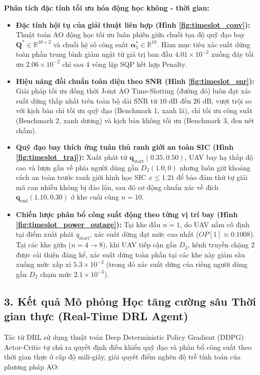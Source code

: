 \vspace{0.1cm}
\textbf{Phân tích đặc tính tối ưu hóa động học không - thời gian:}
\begin{itemize}[leftmargin=1.5em]
    \item \textbf{Đặc tính hội tụ của giải thuật liên hợp (Hình \ref{fig:timeslot_conv}):} Thuật toán AO động học tối ưu luân phiên giữa chuỗi tọa độ quỹ đạo bay $\mathbf{Q}^* \in \mathbb{R}^{10 \times 2}$ và chuỗi hệ số công suất $\boldsymbol{\alpha}_1^* \in \mathbb{R}^{10}$. Hàm mục tiêu xác suất dừng toàn phần trung bình giảm ngặt từ giá trị ban đầu $4.01 \times 10^{-2}$ xuống đáy tối ưu $2.06 \times 10^{-2}$ chỉ sau $4$ vòng lặp SQP kết hợp Penalty.
    \item \textbf{Hiệu năng đối chuẩn toàn diện theo SNR (Hình \ref{fig:timeslot_snr}):} Giải pháp tối ưu đồng thời Joint AO Time-Slotting (đường đỏ) luôn đạt xác suất dừng thấp nhất trên toàn bộ dải SNR từ $10\text{ dB}$ đến $26\text{ dB}$, vượt trội so với kịch bản chỉ tối ưu quỹ đạo (Benchmark 1, xanh lá), chỉ tối ưu công suất (Benchmark 2, xanh dương) và kịch bản không tối ưu (Benchmark 3, đen nét chấm).
    \item \textbf{Quỹ đạo bay thích ứng tuân thủ ranh giới an toàn SIC (Hình \ref{fig:timeslot_traj}):} Xuất phát từ $\mathbf{q}_{\text{start}}(0.35, 0.50)$, UAV bay hạ thấp độ cao và lượn gần về phía người dùng gần $D_2(1.0, 0)$ nhưng luôn giữ khoảng cách an toàn trước ranh giới hình học SIC $x \le 1.21$ để bảo đảm thứ tự giải mã can nhiễu không bị đảo lộn, sau đó cơ động chuẩn xác về đích $\mathbf{q}_{\text{end}}(1.10, 0.30)$ ở khe cuối cùng $n = 10$.
    \item \textbf{Chiến lược phân bổ công suất động theo từng vị trí bay (Hình \ref{fig:timeslot_power_outage}):} Tại khe đầu $n=1$, do UAV nằm cố định tại điểm xuất phát $q_{\text{start}}$, xác suất dừng đạt mức cao nhất ($OP[1] \approx 0.1008$). Tại các khe giữa ($n = 4 \to 8$), khi UAV tiếp cận gần $D_2$, kênh truyền chặng 2 được cải thiện đáng kể, xác suất dừng toàn phần tại các khe này giảm sâu xuống mức xấp xỉ $5.3 \times 10^{-3}$ (trong đó xác suất dừng của riêng người dùng gần $D_2$ chạm mức $2.1 \times 10^{-3}$).
\end{itemize}

\subsection*{3. Kết quả Mô phỏng Học tăng cường sâu Thời gian thực (Real-Time DRL Agent)}
Tác tử DRL sử dụng thuật toán Deep Deterministic Policy Gradient (DDPG) Actor-Critic tự chủ ra quyết định điều khiển quỹ đạo và phân bổ công suất theo thời gian thực ở cấp độ mili-giây, giải quyết điểm nghẽn độ trễ tính toán của phương pháp AO:

